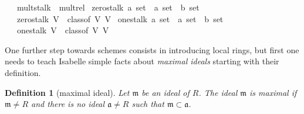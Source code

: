 \documentclass[12pt]{scrartcl}
\newtheorem{definition}[proposition]{Definition}
\begin{document}
\begin{isabelle}
\ \ \ {\isachardoublequoteopen}mult{\isacharunderscore}{\kern0pt}stalk\ {\isasymequiv}\ mult{\isacharunderscore}{\kern0pt}rel{\isachardoublequoteclose}\isanewline
\isanewline
{}\isamarkupfalse%
\ zero{\isacharunderscore}{\kern0pt}stalk{\isacharcolon}{\kern0pt}{\isacharcolon}{\kern0pt}\ {\isachardoublequoteopen}{\isacharprime}{\kern0pt}a\ set\ {\isasymRightarrow}\ {\isacharparenleft}{\kern0pt}{\isacharprime}{\kern0pt}a\ set\ {\isasymtimes}\ {\isacharprime}{\kern0pt}b{\isacharparenright}{\kern0pt}\ set{\isachardoublequoteclose}\isanewline
\ \ \ {\isachardoublequoteopen}zero{\isacharunderscore}{\kern0pt}stalk\ V\ {\isasymequiv}\ class{\isacharunderscore}{\kern0pt}of\ V\ {\isasymzero}\isactrlbsub V\isactrlesub {\isachardoublequoteclose}\isanewline
\isanewline
{}\isamarkupfalse%
\ one{\isacharunderscore}{\kern0pt}stalk{\isacharcolon}{\kern0pt}{\isacharcolon}{\kern0pt}\ {\isachardoublequoteopen}{\isacharprime}{\kern0pt}a\ set\ {\isasymRightarrow}\ {\isacharparenleft}{\kern0pt}{\isacharprime}{\kern0pt}a\ set\ {\isasymtimes}\ {\isacharprime}{\kern0pt}b{\isacharparenright}{\kern0pt}\ set{\isachardoublequoteclose}\isanewline
\ \ \ {\isachardoublequoteopen}one{\isacharunderscore}{\kern0pt}stalk\ V\ {\isasymequiv}\ class{\isacharunderscore}{\kern0pt}of\ V\ {\isasymone}\isactrlbsub V\isactrlesub {\isachardoublequoteclose}\isanewline
\isanewline
{}
\end{isabelle}

One further step towards schemes consists in introducing local rings, but first one needs to teach Isabelle simple facts about \emph{maximal ideals} starting with their definition. 

\begin{definition}[maximal ideal]
	Let $\mathfrak{m}$ be an ideal of $R$. The ideal $\mathfrak{m}$ is maximal if $\mathfrak{m} \neq R$ and there is no ideal $\mathfrak{a} \neq R$ such that $\mathfrak{m} \subset \mathfrak{a}$.
\end{definition}
\end{document}
